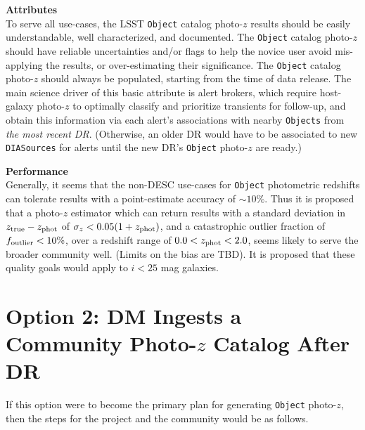 \documentclass[DM,lsstdraft,toc]{lsstdoc}
\begin{document}
{\bf Attributes}\\
To serve all use-cases, the LSST {\tt Object} catalog photo-$z$ results should be easily understandable, well characterized, and documented.
The {\tt Object} catalog photo-$z$ should have reliable uncertainties and/or flags to help the novice user avoid mis-applying the results, or over-estimating their significance.
The {\tt Object} catalog photo-$z$ should always be populated, starting from the time of data release.
The main science driver of this basic attribute is alert brokers, which require host-galaxy photo-$z$ to optimally classify and prioritize transients for follow-up, and obtain this information via each alert's associations with nearby {\tt Objects} from {\it the most recent DR}.
(Otherwise, an older DR would have to be associated to new {\tt DIASources} for alerts until the new DR's {\tt Object} photo-$z$ are ready.)

{\bf Performance}\\
Generally, it seems that the non-DESC use-cases for {\tt Object} photometric redshifts can tolerate results with a point-estimate accuracy of $\sim10\%$.
Thus it is proposed that a photo-$z$ estimator which can return results with a standard deviation in $z_{\rm true}-z_{\rm phot}$ of $\sigma_z < 0.05(1+z_{\rm phot})$, and a catastrophic outlier fraction of $f_{\rm outlier} < 10\%$, over a redshift range of $0.0 < z_{\rm phot} < 2.0$, seems likely to serve the broader community well.
(Limits on the bias are TBD).
It is proposed that these quality goals would apply to $i<25$ mag galaxies.






\clearpage
\section{Option 2: DM Ingests a Community Photo-$z$ Catalog After DR}\label{sec:dmingest}

If this option were to become the primary plan for generating {\tt Object} photo-$z$, then the steps for the project and the community would be as follows.
\end{document}

